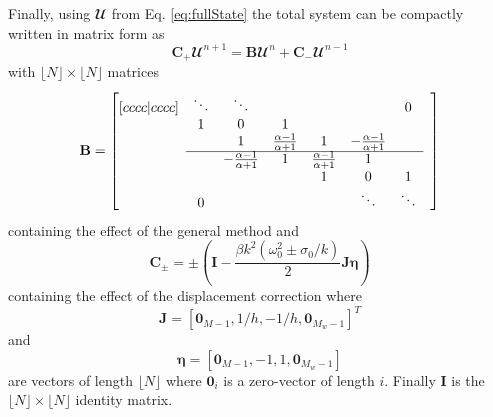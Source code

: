 Finally, using $\mathbfcal{U}$ from Eq. \eqref{eq:fullState} the total system can be compactly written in matrix form as
\begin{equation}\label{eq:totalSystem}
    \mathbf{C}_+\mathbfcal{U}^{n+1} = 
    \mathbf{B}
    \mathbfcal{U}^n
    + \mathbf{C}_-\mathbfcal{U}^{n-1}
\end{equation}
with $\lfloor N\rfloor \times \lfloor N\rfloor$ matrices
\begin{equation}\label{eq:bMat}
    \mathbf{B} = 
    \begin{bmatrix}[cccc|cccc]
        & \ddots  &\ddots & & & & 0 & \\
          & 1 & 0 & 1 & & & & \\
         & & 1 & \frac{\alpha - 1}{\alpha + 1} & 1  & -\frac{\alpha - 1}{\alpha + 1} & \\ \cline{2-7}
         & & -\frac{\alpha - 1}{\alpha + 1} & 1  & \frac{\alpha - 1}{\alpha + 1}  & 1 & & \\
            & & & &1 & 0 & 1  \\
            & 0 & &  &  &\ddots & \ddots &
       \end{bmatrix}
\end{equation}
containing the effect of the general method and
\begin{equation}\label{eq:CMat}
    \mathbf{C}_\pm = \pm\left(\mathbf{I} - \frac{\beta k^2 (\omega_0^2\pm\sigma_0/k)}{2}\mathbf{J}\boldsymbol{\eta}\right)
\end{equation}
containing the effect of the displacement correction where 
\begin{equation}
    \mathbf{J} = [\mathbf{0}_{M-1}, 1/h, -1/h, \mathbf{0}_{M_w-1}]^T
\end{equation}
and 
\begin{equation}
    \boldsymbol{\eta} = [\mathbf{0}_{M-1}, -1, 1, \mathbf{0}_{M_w-1}]
\end{equation}
are vectors of length $\lfloor N\rfloor$ where $\boldsymbol{0}_i$ is a zero-vector of length $i$. Finally $\mathbf{I}$ is the $\lfloor N\rfloor \times \lfloor N\rfloor$ identity matrix.
%
